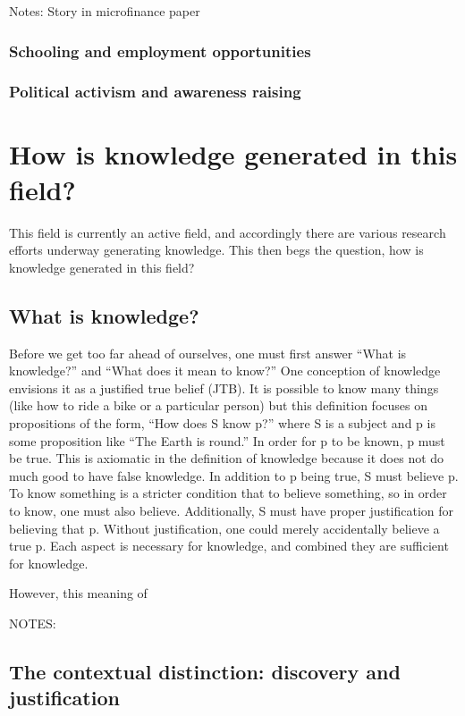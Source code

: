 \documentclass{lps}
\begin{document}
Notes:
Story in microfinance paper 
\subsubsection{Schooling and employment opportunities}
\subsubsection{Political activism and awareness raising}
\section{How is knowledge generated in this field?}


This field is currently an active field, and accordingly there are various research efforts underway generating knowledge. This then begs the question, how is knowledge generated in this field?
\subsection{What is knowledge?}

Before we get too far ahead of ourselves, one must first answer “What is knowledge?” and “What does it mean to know?” One conception of knowledge envisions it as a justified true belief (JTB). It is possible to know many things (like how to ride a bike or a particular person) but this definition focuses on propositions of the form, “How does S know p?” where S is a subject and p is some proposition like “The Earth is round.” In order for p to be known, p must be true. This is axiomatic in the definition of knowledge because it does not do much good to have false knowledge. In addition to p being true, S must believe p. To know something is a stricter condition that to believe something, so in order to know, one must also believe. Additionally, S must have proper justification for believing that p. Without justification, one could merely accidentally believe a true p. Each aspect is necessary for knowledge, and combined they are sufficient for knowledge.

However, this meaning of 



NOTES:




\subsection{The contextual distinction: discovery and justification}
\end{document}
